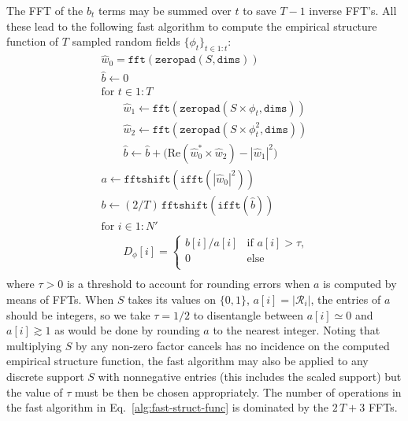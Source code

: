 \documentclass{article}
\renewcommand*{\Re}{\mathrm{Re}}
\begin{document}
The FFT of the $b_{t}$ terms may be summed over $t$ to save $T - 1$ inverse
FFT's. All these lead to the following fast algorithm to compute the empirical
structure function of $T$ sampled random fields $\{\phi_{t}\}_{t\in1:t}$:
\begin{equation}
  \label{alg:fast-struct-func}
  \begin{array}{l}
    \widehat{w}_{0} = \mathtt{fft}(\mathtt{zeropad}(S, \mathtt{dims}))\\
    \widehat{b} \gets 0\\
    \text{for $t \in 1:T$}\\
    \qquad \widehat{w}_{1} \gets
    \mathtt{fft}(\mathtt{zeropad}(S \times \phi_{t}, \mathtt{dims}))\\
    \qquad \widehat{w}_{2} \gets
    \mathtt{fft}(\mathtt{zeropad}(S \times \phi_{t}^{2}, \mathtt{dims}))\\
    \qquad \widehat{b} \gets \widehat{b} +\bigl(
    \Re(\widehat{w}_{0}^{*} \times \widehat{w}_{2})
    - |\widehat{w}_{1}|^{2}\bigr) \\
    a \gets \mathtt{fftshift}(\mathtt{ifft}(|\widehat{w}_{0}|^{2}))\\
    b \gets (2/T)\,\mathtt{fftshift}(\mathtt{ifft}(\widehat{b}))\\
    \text{for $i \in 1:N'$}\\
    \qquad D_{\phi}[i] = \begin{cases}
       b[i]/a[i] & \text{if $a[i] > \tau$,}\\
       0 & \text{else}\\
     \end{cases}\\
  \end{array}
\end{equation}
where $\tau > 0$ is a threshold to account for rounding errors when $a$ is
computed by means of FFTs. When $S$ takes its values on $\{0,1\}$,
$a[i] = |\mathcal{R}_{i}|$, the entries of $a$ should be integers, so we take
$\tau = 1/2$ to disentangle between $a[i] \simeq 0$ and $a[i] \gtrsim 1$ as
would be done by rounding $a$ to the nearest integer. Noting that multiplying
$S$ by any non-zero factor cancels has no incidence on the computed empirical
structure function, the fast algorithm may also be applied to any discrete
support $S$ with nonnegative entries (this includes the scaled support) but the
value of $\tau$ must be then be chosen appropriately. The number of operations
in the fast algorithm in Eq.~\eqref{alg:fast-struct-func} is dominated by the
$2\,T + 3$ FFTs.
\end{document}
